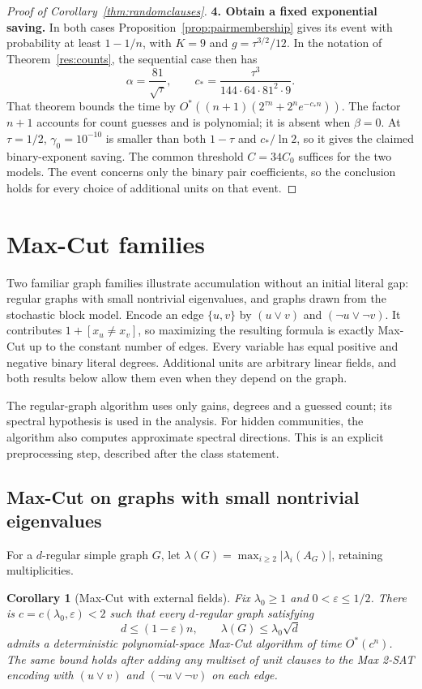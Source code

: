 \documentclass[11pt,a4paper]{article}
\newtheorem{corollary}[theorem]{Corollary}
\theoremstyle{definition}
\theoremstyle{remark}
\newcommand{\Ostar}{O^{*}}
\begin{document}
\begin{proof}[Proof of Corollary~\ref{thm:randomclauses}]
\par\medskip\noindent\textbf{4. Obtain a fixed exponential saving.}
In both cases Proposition~\ref{prop:pairmembership} gives its event
with probability at least $1-1/n$, with $K=9$ and
$g=\tau^{3/2}/12$. In the notation of Theorem~\ref{res:counts},
the sequential case then has
\[
 \alpha=\frac{81}{\sqrt\tau},\qquad
 c_*=\frac{\tau^3}{144\cdot64\cdot81^2\cdot9}.
\]
That theorem bounds the time by
$\Ostar((n+1)(2^{\tau n}+2^ne^{-c_*n}))$.
The factor $n+1$ accounts for count guesses and is polynomial;
it is absent when $\beta=0$. At $\tau=1/2$,
$\gamma_0=10^{-10}$ is smaller than both $1-\tau$ and $c_*/\ln2$,
so it gives the claimed binary-exponent saving.
The common threshold $C=34C_0$ suffices for the two models.
The event concerns only the binary pair coefficients, so the conclusion
holds for every choice of additional units on that event.
\end{proof}


\section{Max-Cut families}\label{sec:maxcut}

Two familiar graph families illustrate accumulation without an initial
literal gap: regular graphs with small nontrivial eigenvalues, and graphs
drawn from the stochastic block model. Encode an edge $\{u,v\}$ by
$(u\lor v)$ and $(\neg u\lor\neg v)$. It contributes
$1+[x_u\ne x_v]$, so maximizing the resulting formula is exactly Max-Cut
up to the constant number of edges. Every variable has equal positive and
negative binary literal degrees. Additional units are arbitrary linear
fields, and both results below allow them even when they depend on the graph.

The regular-graph algorithm uses only gains, degrees and a guessed count;
its spectral hypothesis is used in the analysis. For hidden communities,
the algorithm also computes approximate spectral directions. This is an
explicit preprocessing step, described after the class statement.

\subsection{Max-Cut on graphs with small nontrivial eigenvalues}

For a $d$-regular simple graph $G$, let
$\lambda(G)=\max_{i\ge2}|\lambda_i(A_G)|$, retaining multiplicities.

\begin{corollary}[Max-Cut with external fields]\label{cor:maxcut}
Fix $\lambda_0\ge1$ and $0<\varepsilon\le1/2$. There is
$c=c(\lambda_0,\varepsilon)<2$ such that every $d$-regular graph satisfying
\[
 d\le(1-\varepsilon)n,\qquad \lambda(G)\le\lambda_0\sqrt d
\]
admits a deterministic polynomial-space Max-Cut algorithm of time
$\Ostar(c^n)$. The same bound holds after adding any multiset of unit
clauses to the Max 2-SAT encoding with $(u\lor v)$ and
$(\neg u\lor\neg v)$ on each edge.
\end{corollary}
\end{document}
